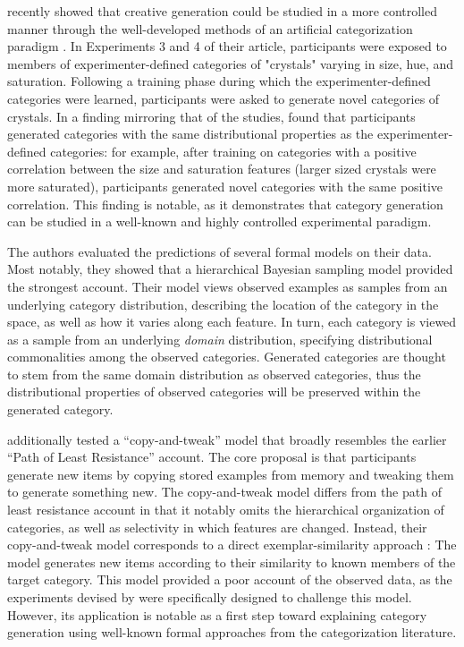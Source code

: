 \documentclass[12pt]{article}
\begin{document}
\begin{flushleft}
\cite{jern2013probabilistic} recently showed that creative generation could be studied in a more controlled manner through the well-developed methods of an artificial categorization paradigm \citep[see][for a review]{kurtz2015human}. In Experiments 3 and 4 of their article, participants were exposed to members of experimenter-defined categories of "crystals" varying in size, hue, and saturation. Following a training phase during which the experimenter-defined categories were learned, participants were asked to generate novel categories of crystals. In a finding mirroring that of the \cite{ward1994structured} studies, \citeauthor{jern2013probabilistic} found that participants generated categories with the same distributional properties as the experimenter-defined categories: for example, after training on categories with a positive correlation between the size and saturation features (larger sized crystals were more saturated), participants generated novel categories with the same positive correlation. This finding is notable, as it demonstrates that category generation can be studied in a well-known and highly controlled experimental paradigm. 

The authors evaluated the predictions of several formal models on their data. Most notably, they showed that a hierarchical Bayesian sampling model provided the strongest account. Their model views observed examples as samples from an underlying category distribution, describing the location of the category in the space, as well as how it varies along each feature. In turn, each category is viewed as a sample from an underlying {\em domain} distribution, specifying distributional commonalities among the observed categories. Generated categories are thought to stem from the same domain distribution as observed categories, thus the distributional properties of observed categories will be preserved within the generated category.

\cite{jern2013probabilistic} additionally tested a ``copy-and-tweak'' model that broadly resembles the earlier ``Path of Least Resistance'' account. The core proposal is that participants generate new items by copying stored examples from memory and tweaking them to generate something new. The copy-and-tweak model differs from the path of least resistance account in that it notably omits the hierarchical organization of categories, as well as selectivity in which features are changed. Instead, their copy-and-tweak model corresponds to a direct exemplar-similarity approach \citep[e.g.,][]{nosofsky1984choice,nosofsky1986attention}: The model generates new items according to their similarity to known members of the target category. This model provided a poor account of the observed data, as the experiments devised by \citeauthor{jern2013probabilistic} were specifically designed to challenge this model. However, its application is notable as a first step toward explaining category generation using well-known formal approaches from the categorization literature.



\end{flushleft}
\end{document}
